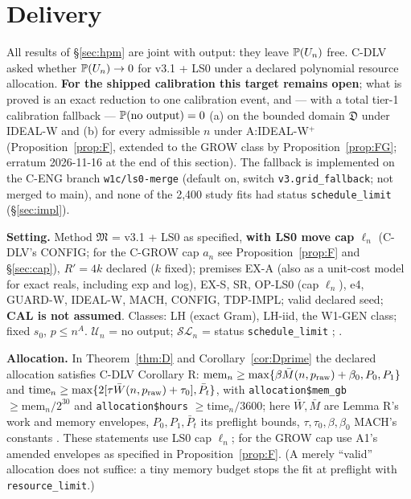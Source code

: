 \section{Delivery}\label{sec:delivery}

All results of §\ref{sec:hpm} are joint with output: they leave $\mathbb P(U_n)$ free. C-DLV asked whether $\mathbb P(U_n)\to0$ for v3.1 + LS0 under a declared polynomial resource allocation. \textbf{For the shipped calibration this target remains open}; what is proved is an exact reduction to one calibration event, and — with a total tier-1 calibration fallback — $\mathbb P(\text{no output})=0$ (a) on the bounded domain $\mathfrak D$ under IDEAL-W and (b) for every admissible $n$ under A:IDEAL-W$^{+}$ (Proposition~\ref{prop:F}, extended to the GROW class by Proposition~\ref{prop:FG}; erratum 2026-11-16 at the end of this section). The fallback is implemented on the C-ENG branch \texttt{w1c/ls0-merge} (default on, switch \texttt{v3.grid\_fallback}; not merged to main), and none of the 2,400 study fits had status \texttt{schedule\_limit} (§\ref{sec:impl}).

\textbf{Setting.} Method $\mathfrak M$ = v3.1 + LS0 as specified, \textbf{with LS0 move cap $\ell_n$} (C-DLV's CONFIG; for the C-GROW cap $a_n$ see Proposition~\ref{prop:F} and §\ref{sec:cap}), $R'=4k$ declared ($k$ fixed); premises EX-A (also as a unit-cost model for exact reals, including exp and log), EX-S, SR, OP-LS0 (cap $\ell_n$), e4, GUARD-W, IDEAL-W, MACH, CONFIG, TDP-IMPL; valid declared seed; \textbf{CAL is not assumed}. Classes: LH (exact Gram), LH-iid, the W1-GEN class; fixed $s_0$, $p\le n^A$. $\mathcal U_n$ = no output; $\mathcal{SL}_n$ = status \texttt{schedule\_limit} ; .

\textbf{Allocation.} In Theorem~\ref{thm:D} and Corollary~\ref{cor:Dprime} the declared allocation satisfies C-DLV Corollary R: $\mathrm{mem}_n\ge\max\{\beta\bar{M}(n,p_{\rm raw})+\beta_0,P_0,P_1\}$ and $\mathrm{time}_n\ge\max\{2[\tau\bar{W}(n,p_{\rm raw})+\tau_0],\bar{P}_t\}$, with \texttt{allocation\$mem\_gb} $\ge\mathrm{mem}_n/2^{30}$ and \texttt{allocation\$hours} $\ge\mathrm{time}_n/3600$; here $\bar W,\bar M$ are Lemma R's work and memory envelopes, $P_0,P_1,\bar P_t$ its preflight bounds, $\tau,\tau_0,\beta,\beta_0$ MACH's constants . These statements use LS0 cap $\ell_n$; for the GROW cap use A1's amended envelopes as specified in Proposition~\ref{prop:F}. (A merely ``valid'' allocation does not suffice: a tiny memory budget stops the fit at preflight with \texttt{resource\_limit}.)

